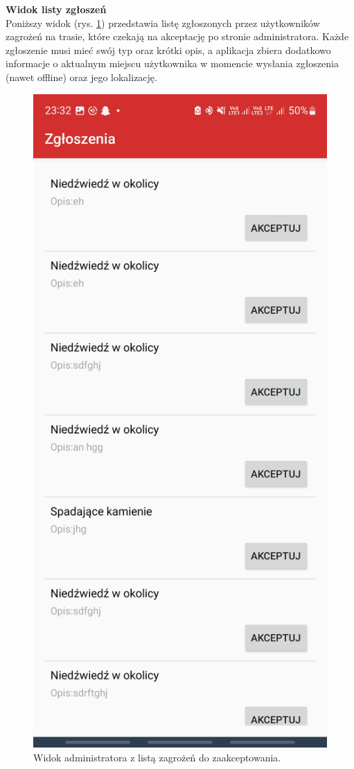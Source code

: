 \textbf{Widok listy zgłoszeń}\\
Poniższy widok (rys. \ref{widok:adminaccept}) przedstawia listę zgłoszonych przez użytkowników zagrożeń na trasie, które czekają na akceptację po stronie administratora. Każde zgłoszenie musi mieć swój typ oraz krótki opis, a aplikacja zbiera dodatkowo informacje o aktualnym miejscu użytkownika w momencie wysłania zgłoszenia (nawet offline) oraz jego lokalizację.
\begin{figure}[H]
    \centering
    \includegraphics[scale=0.15]{img/imp/widok-admin-accept.jpg}
    \caption{Widok administratora z listą zagrożeń do zaakceptowania.}
    \label{widok:adminaccept}
\end{figure}

